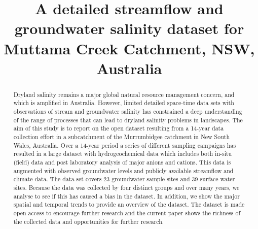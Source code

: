 \documentclass[, manuscript]{copernicus}
\begin{document}
\title{A detailed streamflow and groundwater salinity dataset for
Muttama Creek Catchment, NSW, Australia}











\received{}
\pubdiscuss{} %
\revised{}
\accepted{}
\published{}




\maketitle


\begin{abstract}
Dryland salinity remains a major global natural resource management
concern, and which is amplified in Australia. However, limited detailed
space-time data sets with observations of stream and groundwater
salinity has constrained a deep understanding of the range of processes
that can lead to dryland salinity problems in landscapes. The aim of
this study is to report on the open dataset resulting from a 14-year
data collection effort in a subcatchment of the Murrumbidgee catchment
in New South Wales, Australia. Over a 14-year period a series of
different sampling campaigns has resulted in a large dataset with
hydrogeochemical data which includes both in-situ (field) data and post
laboratory analysis of major anions and cations. This data is augmented
with observed groundwater levels and publicly available streamflow and
climate data. The data set covers 23 groundwater sample sites and 39
surface water sites. Because the data was collected by four distinct
groups and over many years, we analyse to see if this has caused a bias
in the dataset. In addition, we show the major spatial and temporal
trends to provide an overview of the dataset. The dataset is made open
access to encourage further research and the current paper shows the
richness of the collected data and opportunities for further research.
\end{abstract}
\end{document}
